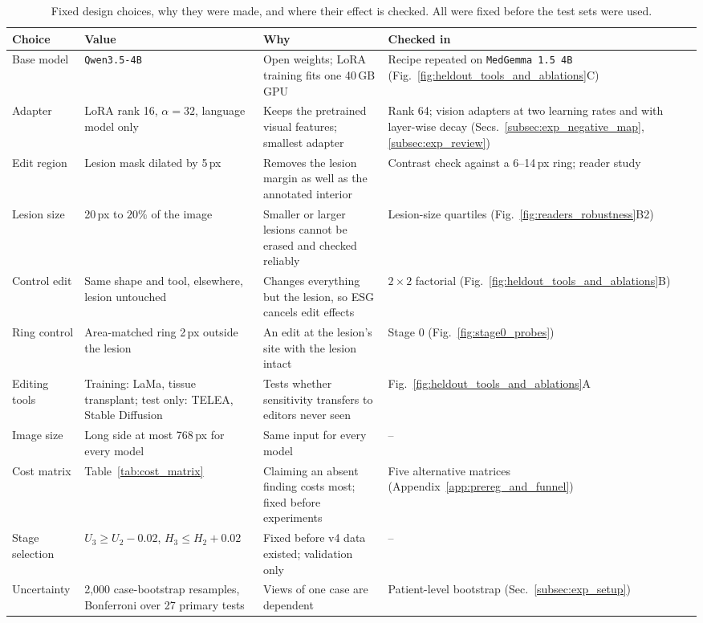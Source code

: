 \documentclass{article} %
\begin{document}
\begin{table}[t]
\caption{Fixed design choices, why they were made, and where their effect is checked. All were fixed before the test sets were used.}
\label{tab:design}
\begin{center}
\small
\begin{adjustbox}{max width=\linewidth}
\begin{tabular}{L{2.6cm}L{3.4cm}L{4.6cm}L{3.6cm}}
\toprule
\textbf{Choice} & \textbf{Value} & \textbf{Why} & \textbf{Checked in} \\
\midrule
Base model & \texttt{Qwen3.5-4B} & Open weights; LoRA training fits one 40\,GB GPU & Recipe repeated on \texttt{MedGemma 1.5 4B} (Fig.~\ref{fig:heldout_tools_and_ablations}C) \\
Adapter & LoRA rank 16, $\alpha = 32$, language model only & Keeps the pretrained visual features; smallest adapter & Rank 64; vision adapters at two learning rates and with layer-wise decay (Secs.~\ref{subsec:exp_negative_map}, \ref{subsec:exp_review}) \\
Edit region & Lesion mask dilated by 5\,px & Removes the lesion margin as well as the annotated interior & Contrast check against a 6--14\,px ring; reader study \\
Lesion size & 20\,px to $20\%$ of the image & Smaller or larger lesions cannot be erased and checked reliably & Lesion-size quartiles (Fig.~\ref{fig:readers_robustness}B2) \\
Control edit & Same shape and tool, elsewhere, lesion untouched & Changes everything but the lesion, so ESG cancels edit effects & $2\times 2$ factorial (Fig.~\ref{fig:heldout_tools_and_ablations}B) \\
Ring control & Area-matched ring 2\,px outside the lesion & An edit at the lesion's site with the lesion intact & Stage 0 (Fig.~\ref{fig:stage0_probes}) \\
Editing tools & Training: LaMa, tissue transplant; test only: TELEA, Stable Diffusion & Tests whether sensitivity transfers to editors never seen & Fig.~\ref{fig:heldout_tools_and_ablations}A \\
Image size & Long side at most 768\,px for every model & Same input for every model & -- \\
Cost matrix & Table~\ref{tab:cost_matrix} & Claiming an absent finding costs most; fixed before experiments & Five alternative matrices (Appendix~\ref{app:prereg_and_funnel}) \\
Stage selection & $U_3 \ge U_2 - 0.02$, $H_3 \le H_2 + 0.02$ & Fixed before v4 data existed; validation only & -- \\
Uncertainty & 2{,}000 case-bootstrap resamples, Bonferroni over 27 primary tests & Views of one case are dependent & Patient-level bootstrap (Sec.~\ref{subsec:exp_setup}) \\
\bottomrule
\end{tabular}
\end{adjustbox}
\end{center}
\end{table}
\end{document}
